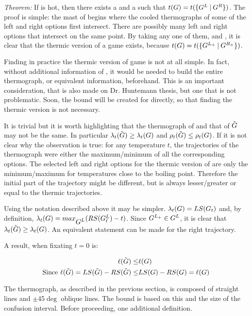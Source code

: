 \textit{Theorem:} If \Gm{} is hot, then there exists a  and a  such that $t(G) = t(\mbox{$\{\mbox{$G^L$}\:|\:\mbox{$G^R$}\}$})$. The proof is simple: the mast of \Gm{} begins where the cooled thermographs of some of the left and right options first intersect. There are possibly many left and right options that intersect on the same point. By taking any one of them,  and , it is clear that the thermic version of a game exists, because $t(G) = t(\mbox{$\{\mbox{$G^{L_+}$}\:|\:\mbox{$G^{R_+}$}\}$})$.

Finding in practice the thermic version of game is not at all simple. In fact, without additional information of \Gm{}, it would be needed to build the entire thermograph, or equivalent information, beforehand. This is an important consideration, that is also made on Dr. Huntemann thesis, but one that is not problematic. Soon, the bound will be created for \Gm{} directly, so that finding the thermic version is not necessary.

It is trivial but it is worth highlighting that the thermograph of \Gm{} and that of $\tilde{\mbox{$G$}}$ may not be the same. In particular $\lambda_t(\tilde{\mbox{$G$}}) \ge \lambda_t(\mbox{$G$})$ and $\rho_t(\tilde{\mbox{$G$}}) \leq \rho_t(\mbox{$G$})$. If it is not clear why the observation is true: for any temperature $t$, the trajectories of the thermograph were either the maximum/minimum of all the corresponding options. The selected left and right options for the thermic version of \Gm{} are only the minimum/maximum for temperatures close to the boiling point. Therefore the initial part of the trajectory might be different, but is always lesser/greater or equal to the thermic trajectories.

Using the notation described above it may be simpler. $\lambda_t(\mbox{$G$}) = LS(\mbox{$G_t$})$ and, by definition, $\lambda_t(\mbox{$G$}) = max_{\mbox{$G^L$}}(RS(\mbox{$G^L_t$}) - t)$. Since $\mbox{$G^{L_+}$} \in \mbox{$G^L$}$, it is clear that $\lambda_t(\tilde{\mbox{$G$}}) \ge \lambda_t(\mbox{$G$})$. An equivalent statement can be made for the right trajectory.

A result, when fixating $t=0$ is:

\begin{align*}
\ell(\tilde{\mbox{$G$}}) \leq& \ell(\mbox{$G$})\\
\text{Since } \ell(\tilde{\mbox{$G$}}) = LS(\tilde{\mbox{$G$}}) - RS(\tilde{\mbox{$G$}})\leq& LS(\mbox{$G$}) - RS(\mbox{$G$}) = \ell(\mbox{$G$})
\end{align*}

The thermograph, as described in the previous section, is composed of straight lines and $\pm$45$\deg$ oblique lines. The bound is based on this and the size of the confusion interval. Before proceeding, one additional definition.

